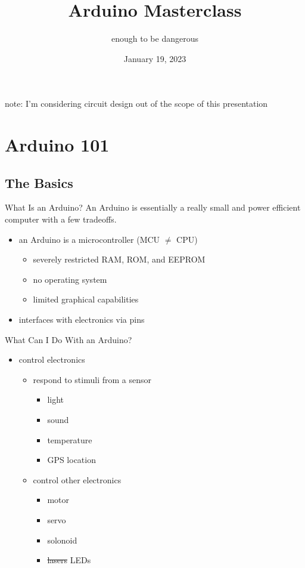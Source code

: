\documentclass{beamer}
\title{Arduino Masterclass}
\subtitle{enough to be dangerous}
\date{January 19, 2023}
\begin{document}
	\begin{frame}
		\titlepage
	\end{frame}

	\begin{frame}
		note: I'm considering circuit design out of the scope of this presentation
		\tableofcontents
	\end{frame}

	\section{Arduino 101}
	\subsection{The Basics}
	\begin{frame}{What Is an Arduino?}
		An Arduino is essentially a really small and power efficient computer with a few tradeoffs.

		\begin{itemize}
			\item an Arduino is a microcontroller (MCU $\neq$ CPU)
			\begin{itemize}
				\item severely restricted RAM, ROM, and EEPROM
				\item no operating system
				\item limited graphical capabilities
			\end{itemize}
			\item interfaces with electronics via pins
		\end{itemize}
	\end{frame}

	\begin{frame}{What Can I Do With an Arduino?}
		\begin{itemize}
			\item control electronics
			\begin{itemize}
				\item respond to stimuli from a sensor
				\begin{itemize}
					\item light
					\item sound
					\item temperature
					\item GPS location
				\end{itemize}

				\item control other electronics
				\begin{itemize}
					\item motor
					\item servo
					\item solonoid
					\item \sout{lasers} LEDs
				\end{itemize}
			\end{itemize}
		\end{itemize}
	\end{frame}
\end{document}

